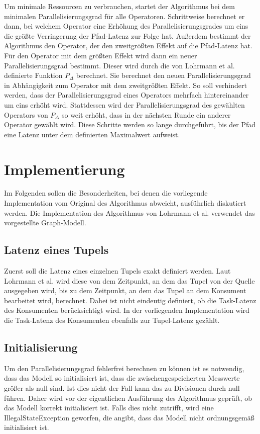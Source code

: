 Um minimale Ressourcen zu verbrauchen, startet der Algorithmus bei dem minimalen Parallelisierungsgrad für alle Operatoren.
Schrittweise berechnet er dann, bei welchem Operator eine Erhöhung des Parallelisierungsgrades um eins die größte Verringerung der Pfad-Latenz zur Folge hat.
Außerdem bestimmt der Algorithmus den Operator, der den zweitgrößten Effekt auf die Pfad-Latenz hat.
Für den Operator mit dem größten Effekt wird dann ein neuer Parallelisierungsgrad bestimmt.
Dieser wird durch die von Lohrmann et al. definierte Funktion \(P_\Delta\) berechnet.
Sie berechnet den neuen Parallelisierungsgrad in Abhängigkeit zum Operator mit dem zweitgrößten Effekt.
So soll verhindert werden, dass der Parallelisierungsgrad eines Operators mehrfach hintereinander um eins erhöht wird.
Stattdessen wird der Parallelisierungsgrad des gewählten Operators von \(P_\Delta\) so weit erhöht, dass in der nächsten Runde ein anderer Operator gewählt wird.
Diese Schritte werden so lange durchgeführt, bis der Pfad eine Latenz unter dem definierten Maximalwert aufweist.

\section{Implementierung}

Im Folgenden sollen die Besonderheiten, bei denen die vorliegende Implementation vom Original des Algorithmus abweicht, ausführlich diskutiert werden.
Die Implementation des Algorithmus von Lohrmann et al. verwendet das vorgestellte Graph-Modell.

\subsection{Latenz eines Tupels}
Zuerst soll die Latenz eines einzelnen Tupels exakt definiert werden.
Laut Lohrmann et al. wird diese von dem Zeitpunkt, an dem das Tupel von der Quelle ausgegeben wird, bis zu dem Zeitpunkt, an dem das Tupel an dem Konsument bearbeitet wird, berechnet. 
Dabei ist nicht eindeutig definiert, ob die Task-Latenz des Konsumenten berücksichtigt wird. 
In der vorliegenden Implementation wird die Task-Latenz des Konsumenten ebenfalls zur Tupel-Latenz gezählt.

\subsection{Initialisierung}
Um den Parallelisierungsgrad fehlerfrei berechnen zu können ist es notwendig, dass das Modell so initialisiert ist, dass die zwischengespeicherten Messwerte größer als null sind.
Ist dies nicht der Fall kann das zu Divisionen durch null führen.
Daher wird vor der eigentlichen Ausführung des Algorithmus geprüft, ob das Modell korrekt initialisiert ist.
Falls dies nicht zutrifft, wird eine IllegalStateException geworfen, die angibt, dass das Modell nicht ordnungsgemäß initialisiert ist.

